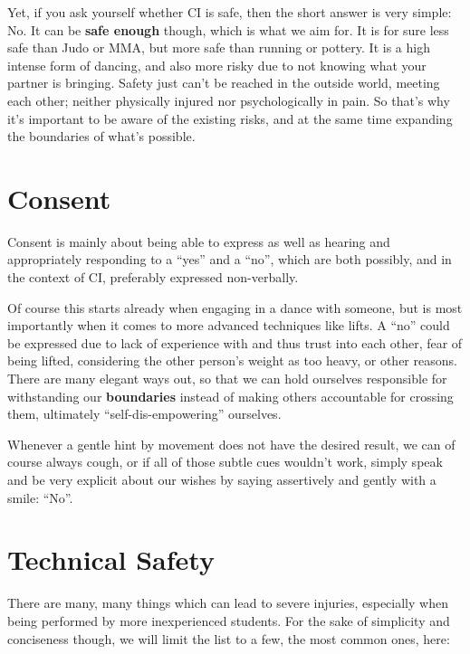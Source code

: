 Yet, if you ask yourself whether CI is safe, then the short answer is very simple: No.
It can be \textbf{safe enough} though, which is what we aim for.
It is for sure less safe than Judo or MMA, but more safe than running or pottery.
It is a high intense form of dancing, and also more risky due to not knowing what your partner is bringing.
Safety just can't be reached in the outside world, meeting each other; neither physically injured nor psychologically in pain.
So that's why it's important to be aware of the existing risks, and at the same time expanding the boundaries of what's possible.

\section{Consent}\label{sec:consent}

Consent is mainly about being able to express as well as hearing and appropriately responding to a ``yes'' and a ``no'', which are both possibly, and in the context of CI, preferably expressed non-verbally.

Of course this starts already when engaging in a dance with someone, but is most importantly when it comes to more advanced techniques like lifts.
A ``no'' could be expressed due to lack of experience with and thus trust into each other, fear of being lifted, considering the other person's weight as too heavy, or other reasons.
There are many elegant ways out, so that we can hold ourselves responsible for withstanding our \textbf{boundaries} instead of making others accountable for crossing them, ultimately ``self-dis-empowering'' ourselves.

Whenever a gentle hint by movement does not have the desired result, we can of course always cough, or if all of those subtle cues wouldn't work, simply speak and be very explicit about our wishes by saying assertively and gently with a smile: ``No''.

\section{Technical Safety}\label{sec:technical-safety}

There are many, many things which can lead to severe injuries, especially when being performed by more inexperienced students.
For the sake of simplicity and conciseness though, we will limit the list to a few, the most common ones, here:


